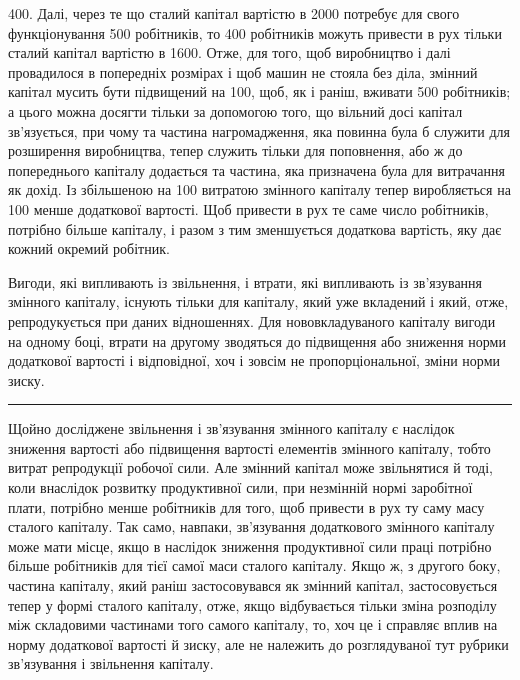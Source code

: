 \parcont{}  %
400. Далі, через те що сталий капітал вартістю в 2000 потребує
для свого функціонування 500 робітників, то 400 робітників можуть привести в рух тільки сталий
капітал вартістю в 1600. Отже,
для того, щоб виробництво і далі провадилося в попередніх
розмірах і щоб  машин не стояла без діла, змінний капітал
мусить бути підвищений на 100, щоб, як і раніш, вживати 500 робітників; а цього
можна досягти тільки за
допомогою того, що вільний досі капітал зв’язується, при чому
та частина нагромадження, яка повинна була б служити для розширення виробництва, тепер служить
тільки для поповнення, або ж
до попереднього капіталу додається та частина, яка призначена
була для витрачання як дохід. Із збільшеною на 100 витратою змінного капіталу тепер виробляється на
100 менше додаткової вартості. Щоб привести
в рух те саме число робітників, потрібно більше капіталу, і разом
з тим зменшується додаткова вартість, яку дає кожний окремий робітник.

Вигоди, які випливають із звільнення, і втрати, які випливають із зв’язування змінного капіталу,
існують тільки для капіталу, який уже вкладений і який, отже, репродукується при даних відношеннях.
Для нововкладуваного капіталу вигоди на
одному боці, втрати на другому зводяться до підвищення або
зниження норми додаткової вартості і відповідної, хоч і зовсім
не пропорціональної, зміни норми зиску.

\pfbreak

Щойно досліджене звільнення і зв’язування змінного капіталу є наслідок зниження вартості або
підвищення вартості
елементів змінного капіталу, тобто витрат репродукції робочої
сили. Але змінний капітал може звільнятися й тоді, коли внаслідок розвитку продуктивної сили, при
незмінній нормі заробітної плати, потрібно менше робітників для того, щоб привести
в рух ту саму масу сталого капіталу. Так само, навпаки, зв’язування додаткового змінного капіталу
може мати місце, якщо
в наслідок зниження продуктивної сили праці потрібно більше
робітників для тієї самої маси сталого капіталу. Якщо ж, з другого боку, частина капіталу, який
раніш застосовувався як змінний капітал, застосовується тепер у формі сталого капіталу, отже, якщо
відбувається тільки зміна розподілу між складовими
частинами того самого капіталу, то, хоч це і справляє вплив
на норму додаткової вартості й зиску, але не належить до розглядуваної тут рубрики зв’язування і
звільнення капіталу.

